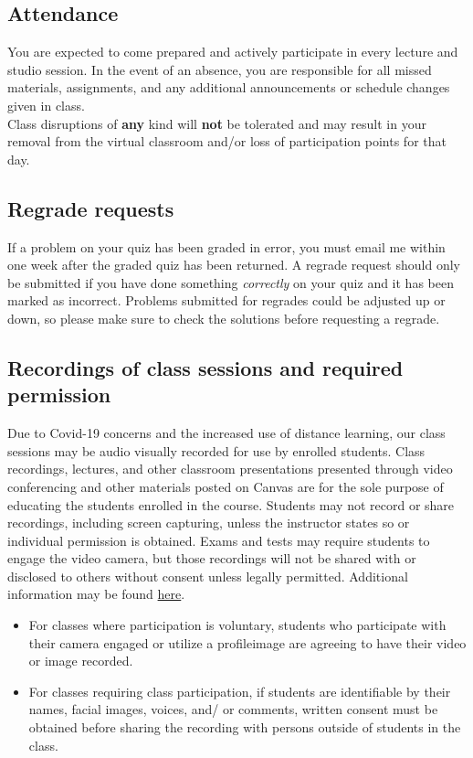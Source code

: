 \documentclass[11pt]{article}
\begin{document}
    \subsection{Attendance}
    
    You are expected to come prepared and actively participate in every lecture and studio session. In the event of an absence, you are responsible for all missed materials, assignments, and any additional announcements or schedule changes given in class.\\
    
    Class disruptions of {\bf any} kind will {\bf not} be tolerated and may result in your removal from the virtual classroom and/or loss of participation points for that day. 

    
    \subsection{Regrade requests}
    
    If a problem on your quiz has been graded in error, you must email me within one week after the graded quiz has been returned. A regrade request should only be submitted if you have done something {\em correctly} on your quiz and it has been marked as incorrect. Problems submitted for regrades could be adjusted up or down, so please make sure to check the solutions before requesting a regrade.
    
    \subsection{Recordings of class sessions and required permission} 
    Due to Covid-19 concerns and the increased use of distance learning, our class sessions may be audio visually recorded for use by enrolled students. Class recordings, lectures, and other classroom presentations presented through video conferencing and other materials posted on Canvas are for the sole purpose of educating the students enrolled in the course. Students may not record or share recordings, including screen capturing, unless the instructor states so or individual permission is obtained. Exams and tests may require students to engage the video camera, but those recordings will not be shared with or disclosed to others without consent unless legally permitted. Additional information may be found 
    \href{https://provost.gatech.edu/academic-restart-frequently-asked-questions}{here}.

    \begin{itemize}
     \item For classes where participation is voluntary, students who participate with their camera engaged or utilize a profileimage are agreeing to have their video or image recorded.
     \item For classes requiring class participation, if students are identifiable by their names, facial images, voices, and/ or comments, written consent must be obtained before sharing the recording with persons outside of students in the class.  
     \end{itemize}
\end{document}
